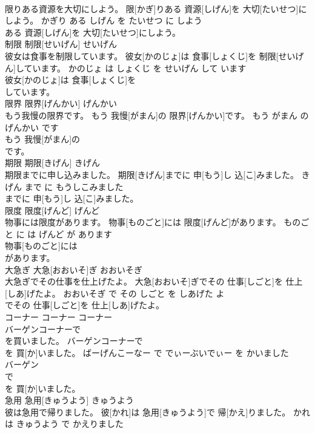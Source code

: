 \documentclass[8pt]{extreport}
\begin{document}
\begin{CJK}{UTF8}{min}
\\	限りある資源を大切にしよう。	限[かぎ]りある 資源[しげん]を 大切[たいせつ]にしよう。	かぎり ある しげん を たいせつ に しよう	
\\	ある 資源[しげん]を 大切[たいせつ]にしよう。			
\\	制限	制限[せいげん]	せいげん	
\\	彼女は食事を制限しています。	彼女[かのじょ]は 食事[しょくじ]を 制限[せいげん]しています。	かのじょ は しょくじ を せいげん して います	
\\	彼女[かのじょ]は 食事[しょくじ]を
\\	しています。			
\\	限界	限界[げんかい]	げんかい	
\\	もう我慢の限界です。	もう 我慢[がまん]の 限界[げんかい]です。	もう がまん の げんかい です	
\\	もう 我慢[がまん]の
\\	です。			
\\	期限	期限[きげん]	きげん	
\\	期限までに申し込みました。	期限[きげん]までに 申[もう]し 込[こ]みました。	きげん まで に もうしこみました	
\\	までに 申[もう]し 込[こ]みました。			
\\	限度	限度[げんど]	げんど	
\\	物事には限度があります。	物事[ものごと]には 限度[げんど]があります。	ものごと に は げんど が あります	
\\	物事[ものごと]には
\\	があります。			
\\	大急ぎ	大急[おおいそ]ぎ	おおいそぎ	
\\	大急ぎでその仕事を仕上げたよ。	大急[おおいそ]ぎでその 仕事[しごと]を 仕上[しあ]げたよ。	おおいそぎ で その しごと を しあげた よ	
\\	でその 仕事[しごと]を 仕上[しあ]げたよ。			
\\	コーナー	コーナー	コーナー	
\\	バーゲンコーナーで
\\	を買いました。	バーゲンコーナーで 
\\	[でぃーぶいでぃー]を 買[か]いました。	ばーげんこーなー で でぃーぶいでぃー を かいました	
\\	バーゲン
\\	で 
\\	[でぃーぶいでぃー]を 買[か]いました。			
\\	急用	急用[きゅうよう]	きゅうよう	
\\	彼は急用で帰りました。	彼[かれ]は 急用[きゅうよう]で 帰[かえ]りました。	かれ は きゅうよう で かえりました	

\end{CJK}
\end{document}
